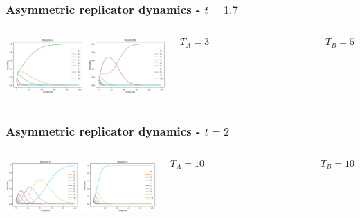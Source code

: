 \begin{frame}
    \frametitle{Asymmetric replicator dynamics - \(t = 1.7\)}

    \begin{columns}
        \centering
        \column{\dimexpr\paperwidth-10pt}
        \includegraphics[width=\textwidth]{Bin/replicator_dynamics/ard_t_1.7.png}

        \[T_A = 3  \qquad \qquad \qquad \qquad \qquad \qquad T_B = 5\]
    \end{columns}
    
\end{frame}


\begin{frame}
    \frametitle{Asymmetric replicator dynamics - \(t = 2\)}

    \begin{columns}
        \centering
        \column{\dimexpr\paperwidth-10pt}
        \includegraphics[width=\textwidth]{Bin/replicator_dynamics/ard_t_2.png}

        \[ T_A = 10  \qquad \qquad \qquad \qquad \qquad \qquad T_B = 10\]
    \end{columns}
    
\end{frame}


